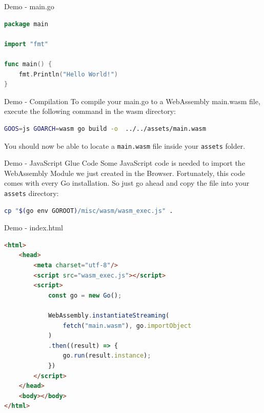 \documentclass{beamer}
\begin{document}
\begin{frame}[fragile]{Demo - main.go}
    \begin{lstlisting}[language=Go,basicstyle=\footnotesize]
package main

import "fmt"

func main() {
	fmt.Println("Hello World!")
}

    \end{lstlisting}
\end{frame}

\begin{frame}[fragile]{Demo - Compilation}
    To compile your main.go to a WebAssembly main.wasm file, execute the following command in the wasm directory:

    \begin{lstlisting}[language=Bash,basicstyle=\footnotesize]
GOOS=js GOARCH=wasm go build -o  ../../assets/main.wasm
    \end{lstlisting}

    You should now be able to locate a \lstinline{main.wasm} file inside your \lstinline{assets} folder.
\end{frame}

\begin{frame}[fragile]{Demo - JavaScript Glue Code}
    Some JavaScript code is needed to import the WebAssembly Module we just created in the Browser. Fortunately, this code comes with every Go installation. So just go ahead and copy the file into your \lstinline{assets} directory:

    \begin{lstlisting}[language=Bash,basicstyle=\footnotesize]
cp "$(go env GOROOT)/misc/wasm/wasm_exec.js" .
\end{lstlisting}
\end{frame}

\begin{frame}[fragile]{Demo - index.html}
    \begin{lstlisting}[language=html,basicstyle=\footnotesize]
<html>
    <head>
        <meta charset="utf-8"/>
        <script src="wasm_exec.js"></script>
        <script>
            const go = new Go();

            WebAssembly.instantiateStreaming(
                fetch("main.wasm"), go.importObject
            )
            .then((result) => {
                go.run(result.instance);
            })
        </script>
    </head>
    <body></body>
</html>
\end{lstlisting}
\end{frame}
\end{document}
